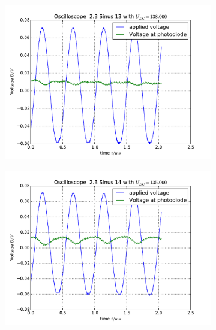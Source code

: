 \begin{figure}
    \begin{subfigure}[b]{\picwidth}
        \includegraphics[width=\textwidth]{analysis/figures/23sinus13}
        \caption{}
    \end{subfigure}\qquad
    \begin{subfigure}[b]{\picwidth}
        \includegraphics[width=\textwidth]{analysis/figures/23sinus14}
        \caption{}
    \end{subfigure}
    \begin{subfigure}[b]{\picwidth}

\end{subfigure}
\end{figure}
